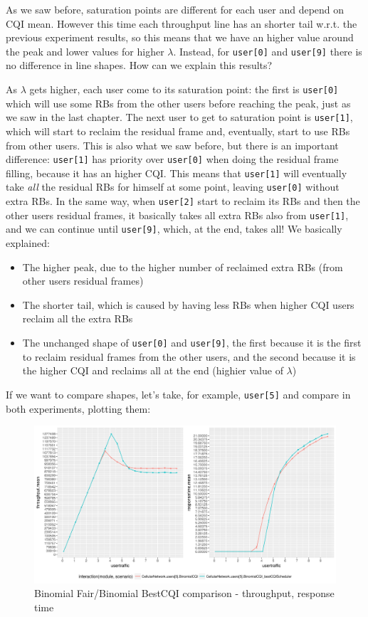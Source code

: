 As we saw before, saturation points are different for each user and depend on CQI mean. However this time each throughput line has an shorter tail w.r.t. the previous experiment results, so this means that we have an higher value around the peak and lower values for higher \(\lambda\). Instead, for \texttt{user[0]} and \texttt{user[9]} there is no difference in line shapes. How can we explain this results?

As \(\lambda\) gets higher, each user come to its saturation point: the first is \texttt{user[0]} which will use some RBs from the other users before reaching the peak, just as we saw in the last chapter. The next user to get to saturation point is \texttt{user[1]}, which will start to reclaim the residual frame and, eventually, start to use RBs from other users. This is also what we saw before, but there is an important difference: \texttt{user[1]} has priority over \texttt{user[0]} when doing the residual frame filling, because it has an higher CQI. This means that \texttt{user[1]} will eventually take \textit{all} the residual RBs for himself at some point, leaving \texttt{user[0]} without extra RBs. In the same way, when \texttt{user[2]} start to reclaim its RBs and then the other users residual frames, it basically takes all extra RBs also from \texttt{user[1]}, and we can continue until \texttt{user[9]}, which, at the end, takes all!
We basically explained:
\begin{itemize}
	\item The higher peak, due to the higher number of reclaimed extra RBs (from other users residual frames)
	\item The shorter tail, which is caused by having less RBs when higher CQI users reclaim all the extra RBs
	\item The unchanged shape of \texttt{user[0]} and \texttt{user[9]}, the first because it is the first to reclaim residual frames from the other users, and the second because it is the higher CQI and reclaims all at the end (highier value of \(\lambda\))
\end{itemize}

If we want to compare shapes, let's take, for example, \texttt{user[5]} and compare in both experiments, plotting them:

\begin{figure}[H]
  \includegraphics[width=1\textwidth]{images/th-binom-binombest-5-5.png}
  \caption{Binomial Fair/Binomial BestCQI comparison - throughput, response time}
  \label{fig:th-binom-binombest-5-5}
\end{figure}

